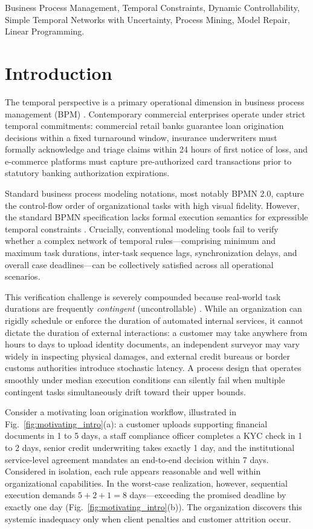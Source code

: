 \documentclass[conference]{IEEEtran}
\begin{document}
\begin{IEEEkeywords}
Business Process Management, Temporal Constraints, Dynamic Controllability, Simple Temporal Networks with Uncertainty, Process Mining, Model Repair, Linear Programming.
\end{IEEEkeywords}

\section{Introduction}
\label{sec:intro}

The temporal perspective is a primary operational dimension in business process management (BPM) \cite{cheikhrouhou2015, eder2020}. Contemporary commercial enterprises operate under strict temporal commitments: commercial retail banks guarantee loan origination decisions within a fixed turnaround window, insurance underwriters must formally acknowledge and triage claims within 24 hours of first notice of loss, and e-commerce platforms must capture pre-authorized card transactions prior to statutory banking authorization expirations.

Standard business process modeling notations, most notably BPMN 2.0, capture the control-flow order of organizational tasks with high visual fidelity. However, the standard BPMN specification lacks formal execution semantics for expressible temporal constraints \cite{ocampo2022}. Crucially, conventional modeling tools fail to verify whether a complex network of temporal rules—comprising minimum and maximum task durations, inter-task sequence lags, synchronization delays, and overall case deadlines—can be collectively satisfied across all operational scenarios.

This verification challenge is severely compounded because real-world task durations are frequently \textit{contingent} (uncontrollable) \cite{vidal1999}. While an organization can rigidly schedule or enforce the duration of automated internal services, it cannot dictate the duration of external interactions: a customer may take anywhere from hours to days to upload identity documents, an independent surveyor may vary widely in inspecting physical damages, and external credit bureaus or border customs authorities introduce stochastic latency. A process design that operates smoothly under median execution conditions can silently fail when multiple contingent tasks simultaneously drift toward their upper bounds.

Consider a motivating loan origination workflow, illustrated in Fig.~\ref{fig:motivating_intro}(a): a customer uploads supporting financial documents in 1 to 5 days, a staff compliance officer completes a KYC check in 1 to 2 days, senior credit underwriting takes exactly 1 day, and the institutional service-level agreement mandates an end-to-end decision within 7 days. Considered in isolation, each rule appears reasonable and well within organizational capabilities. In the worst-case realization, however, sequential execution demands $5 + 2 + 1 = 8$ days—exceeding the promised deadline by exactly one day (Fig.~\ref{fig:motivating_intro}(b)). The organization discovers this systemic inadequacy only when client penalties and customer attrition occur.
\end{document}
